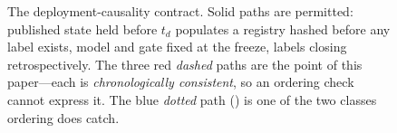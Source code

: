 \begin{figure}[!t]
{}
\caption{The deployment-causality contract. Solid paths are permitted: published state held before
$t_d$ populates a registry hashed before any label exists, model and gate fixed at the freeze,
labels closing retrospectively. The three red \emph{dashed} paths are the point of this paper---each
is \emph{chronologically consistent}, so an ordering check cannot express it. The blue \emph{dotted}
path () is one of the two classes ordering does catch.}
\label{fig:contract}
\end{figure}
